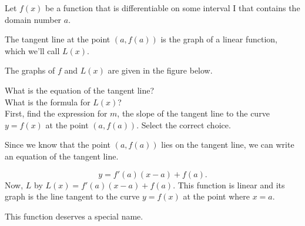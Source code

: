 \documentclass{ximera}
\begin{document}
\begin{example}



Let $f(x)$ be a function that is differentiable on some interval I that contains the domain number $a$. 

The tangent line at the point $(a, f(a))$ is the graph of a linear function, which we'll call $L(x)$.



The graphs of $f$  and $L(x)$ are given in the figure below.


 \begin{image}
\end{image}

What is the equation of the tangent line?\\
What is the formula for $L(x)$? \\




First, find the expression for $m$, the slope of the tangent line to the curve $y=f(x)$ at the point $(a,f(a))$.
 Select the correct choice.
 \begin{multipleChoice}
  \end{multipleChoice}
Since we know that the point $(a,f(a))$  lies on the tangent line,  we can write an equation of the tangent line. 

\[
y= f'(a)(x-a) +f(a).
\]
Now, $L$  by $L(x)= f'(a)(x-a) +f(a)$. This function is linear and its graph is the line tangent to the curve $y=f(x)$ at the point where $x=a$.


This function deserves a special name.
\end{example}
\end{document}
